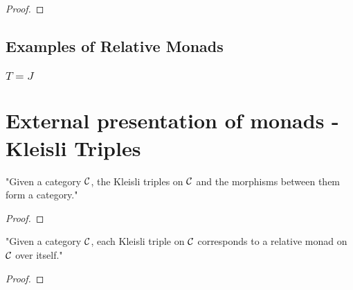 \begin{proposition}
\end{proposition}

\begin{proof}
\end{proof}


\section{Examples of Relative Monads}

\subsection*{$T = J$}

\chapter{External presentation of monads - Kleisli Triples}

\begin{definition}
\end{definition}

\begin{definition}
\end{definition}

  \begin{proposition} \label{prop:kleisli-triple-cat}
    "Given a category $\mathcal{C}$, the Kleisli triples on $\mathcal{C}$ and the morphisms between them form a category."
  \end{proposition}
  \begin{proof}
\end{proof}

  \begin{proposition} \label{prop:injection-kt-rm}
    "Given a category $\mathcal{C}$, each Kleisli triple on $\mathcal{C}$ corresponds to a relative monad on $\mathcal{C}$ over itself." %
  \end{proposition}
  \begin{proof}
\end{proof}




